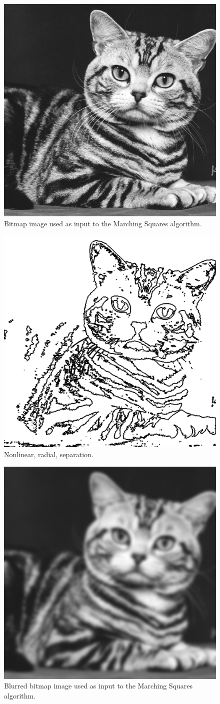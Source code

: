 \documentclass[12pt]{article}
\begin{document}
\begin{figure} 
\centering
  \includegraphics[width = 3 in]{cat_image.png}
  \caption{Bitmap image used as input to the Marching Squares algorithm.
}
\end{figure}


\begin{figure} 
\centering
  \includegraphics[width = 3 in]{cat_isosurface.png}
  \caption{Nonlinear, radial, separation.
}
\end{figure}


\begin{figure} 
\centering
  \includegraphics[width = 3 in]{cat_blurred_image.png}
  \caption{Blurred bitmap image used as input to the Marching Squares algorithm.
}
\end{figure}
\end{document}
